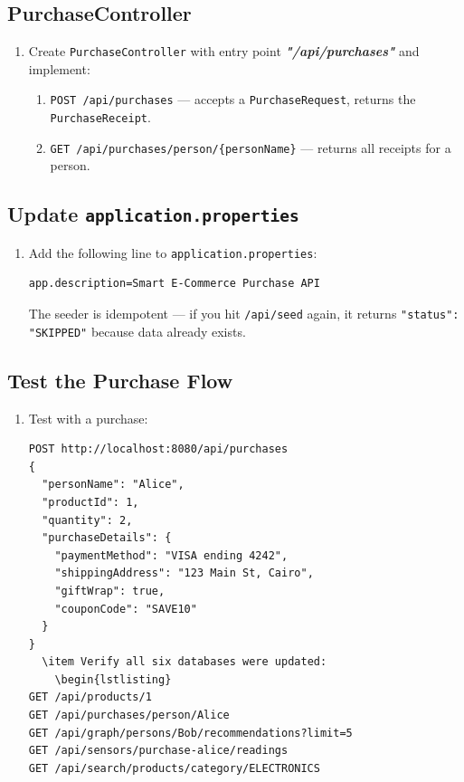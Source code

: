 \documentclass[a4paper]{article}
\begin{document}
\subsection*{PurchaseController}
\begin{enumerate}
  \item Create \texttt{PurchaseController} with entry point \textit{\textbf{"/api/purchases"}} and implement:
    \begin{enumerate}
      \item \texttt{POST /api/purchases} --- accepts a \texttt{PurchaseRequest}, returns the \texttt{PurchaseReceipt}.
      \item \texttt{GET /api/purchases/person/\{personName\}} --- returns all receipts for a person.
    \end{enumerate}
\end{enumerate}

\subsection*{Update \texttt{application.properties}}
\begin{enumerate}
  \item Add the following line to \texttt{application.properties}:
    \begin{verbatim}
app.description=Smart E-Commerce Purchase API
    \end{verbatim}
    The seeder is idempotent --- if you hit \texttt{/api/seed} again, it returns \texttt{"status": "SKIPPED"} because data already exists.
\end{enumerate}

\subsection*{Test the Purchase Flow}
\begin{enumerate}
  \item Test with a purchase:
    \begin{lstlisting}
POST http://localhost:8080/api/purchases
{
  "personName": "Alice",
  "productId": 1,
  "quantity": 2,
  "purchaseDetails": {
    "paymentMethod": "VISA ending 4242",
    "shippingAddress": "123 Main St, Cairo",
    "giftWrap": true,
    "couponCode": "SAVE10"
  }
}
  \item Verify all six databases were updated:
    \begin{lstlisting}
GET /api/products/1
GET /api/purchases/person/Alice
GET /api/graph/persons/Bob/recommendations?limit=5
GET /api/sensors/purchase-alice/readings
GET /api/search/products/category/ELECTRONICS
    \end{lstlisting}
\end{enumerate}
\end{document}
